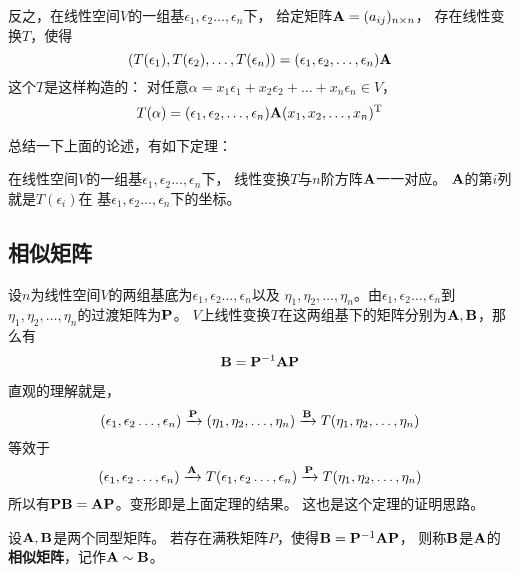 反之，在线性空间$V$的一组基$\epsilon_1,\epsilon_2\dots,\epsilon_n$下，
给定矩阵$\mathbf{A}=(a_{ij})_{n\times n}$，
存在线性变换$T$，使得
\begin{displaymath}
  (T(\epsilon_1), T(\epsilon_2),\dots,T(\epsilon_n)) =
    (\epsilon_1,\epsilon_2,\dots,\epsilon_n)\mathbf{A}
\end{displaymath}
这个$T$是这样构造的：
对任意$\alpha=x_1\epsilon_1+x_2\epsilon_2+\dots+x_n\epsilon_n\in V$，
\begin{displaymath}
  T(\alpha) = (\epsilon_1,\epsilon_2,\dots,\epsilon_n)\mathbf{A}
    (x_1,x_2,\dots,x_n)^{\textrm{T}}
\end{displaymath}

总结一下上面的论述，有如下定理：
\begin{theorem}
  在线性空间$V$的一组基$\epsilon_1,\epsilon_2\dots,\epsilon_n$下，
  线性变换$T$与$n$阶方阵$\mathbf{A}$一一对应。
  $\mathbf{A}$的第$i$列就是$T(\epsilon_i)$在
  基$\epsilon_1,\epsilon_2\dots,\epsilon_n$下的坐标。
\end{theorem}

\subsection{相似矩阵}
\begin{theorem}
  设$n$为线性空间$V$的两组基底为$\epsilon_1,\epsilon_2\dots,\epsilon_n$以及
  $\eta_1,\eta_2,\dots,\eta_n$。由$\epsilon_1,\epsilon_2\dots,\epsilon_n$到
  $\eta_1,\eta_2,\dots,\eta_n$的过渡矩阵为$\mathbf{P}$。
  $V$上线性变换$T$在这两组基下的矩阵分别为$\mathbf{A},\mathbf{B}$，那么有
  \[ \mathbf{B} = \mathbf{P}^{-1}\mathbf{A}\mathbf{P} \]
\end{theorem}

\begin{remark}
  直观的理解就是，
  \begin{displaymath}
    (\epsilon_1,\epsilon_2\dots,\epsilon_n)\xrightarrow{\mathbf{P}}
    (\eta_1,\eta_2,\dots,\eta_n)\xrightarrow{\mathbf{B}}
    T(\eta_1,\eta_2,\dots,\eta_n)
  \end{displaymath}
  等效于
  \begin{displaymath}
  (\epsilon_1,\epsilon_2\dots,\epsilon_n)\xrightarrow{\mathbf{A}}
  T(\epsilon_1,\epsilon_2\dots,\epsilon_n)\xrightarrow{\mathbf{P}}
  T(\eta_1,\eta_2,\dots,\eta_n)
  \end{displaymath}
  所以有$\mathbf{P}\mathbf{B}=\mathbf{A}\mathbf{P}$。变形即是上面定理的结果。
  这也是这个定理的证明思路。
\end{remark}

\begin{definition}[相似矩阵]
  设$\mathbf{A},\mathbf{B}$是两个同型矩阵。
  若存在满秩矩阵$P$，使得$\mathbf{B}=\mathbf{P}^{-1}\mathbf{A}\mathbf{P}$，
  则称$\mathbf{B}$是$\mathbf{A}$的\textbf{相似矩阵}，记作$\mathbf{A}\sim\mathbf{B}$。
\end{definition}

